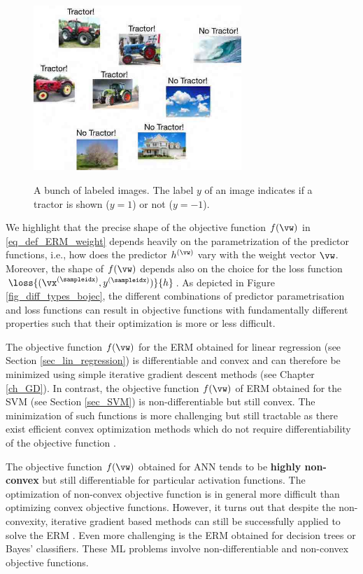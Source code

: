 \documentclass[12pt]{report}
\begin{document}
\begin{figure}[htbp]
    \centering
    \includegraphics[width=0.7\textwidth]{LabeledDataTractor1.jpg}  
    \label{fig_tractors}
        \caption{A bunch of labeled images. The label $y$ of an image indicates if a tractor is shown ($y=1$) or not ($y=-1$).}
\end{figure}

We highlight that the precise shape of the objective function $f(\vw)$ in \eqref{eq_def_ERM_weight} 
depends heavily on the parametrization of the predictor functions, i.e., how does the predictor $h^{(\vw)}$ 
vary with the weight vector $\vw$. Moreover, the shape of $f(\vw)$ depends also on the choice 
for the loss function $\loss{(\vx^{(\sampleidx)},y^{(\sampleidx)})}{h}$. As depicted in Figure \ref{fig_diff_types_bojec}, 
the different combinations of predictor parametrisation and loss functions can result in objective 
functions with fundamentally different properties such that their optimization is more or less difficult. 

The objective function $f(\vw)$ for the ERM obtained for linear regression (see Section \ref{sec_lin_regression}) 
is differentiable and convex and can therefore be minimized using simple iterative gradient descent methods 
(see Chapter \ref{ch_GD}). In contrast, the objective function $f(\vw)$ of ERM obtained for the SVM (see Section \ref{sec_SVM}) 
is non-differentiable but still convex. The minimization of such functions is more challenging but still tractable 
as there exist efficient convex optimization methods which do not require differentiability of the objective 
function \cite{ProximalMethods}. 

The objective function $f(\vw)$ obtained for ANN tends to be {\bf highly non-convex} 
but still differentiable for particular activation functions. The optimization of non-convex 
objective function is in general more difficult than optimizing convex objective functions. 
However, it turns out that despite the non-convexity, iterative gradient based methods can 
still be successfully applied to solve the ERM \cite{Goodfellow-et-al-2016}. Even more 
challenging is the ERM obtained for decision trees or Bayes' classifiers. These ML problems 
involve non-differentiable and non-convex objective functions. 
\end{document}

